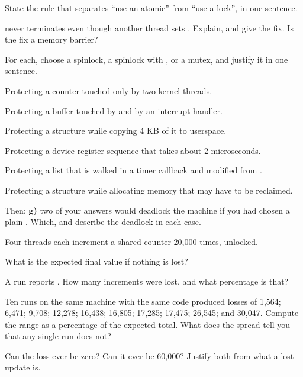  State the rule that separates ``use an atomic'' from ``use a lock'', in one sentence.

  never terminates even though another thread sets .
Explain, and give the fix. Is the fix a memory barrier?

\label{c7:ex:3}

For each, choose a spinlock, a spinlock with , or a mutex, and justify it in one
sentence.

 Protecting a counter touched only by two kernel threads.

 Protecting a buffer touched by  and by an interrupt handler.

 Protecting a structure while copying 4 KB of it to userspace.

 Protecting a device register sequence that takes about 2 microseconds.

 Protecting a list that is walked in a timer callback and modified from .

 Protecting a structure while allocating memory that may have to be reclaimed.

Then: \textbf{g)} two of your answers would deadlock the machine if you had chosen a plain
. Which, and describe the deadlock in each case.

\label{c7:ex:4}

Four threads each increment a shared counter 20,000 times, unlocked.

 What is the expected final value if nothing is lost?

 A run reports . How many increments were lost, and what percentage is
that?

 Ten runs on the same machine with the same code produced losses of 1,564; 6,471; 9,708;
12,278; 16,438; 16,805; 17,285; 17,475; 26,545; and 30,047. Compute the range as a percentage of the
expected total. What does the spread tell you that any single run does not?

 Can the loss ever be zero? Can it ever be 60,000? Justify both from what a lost update is.

